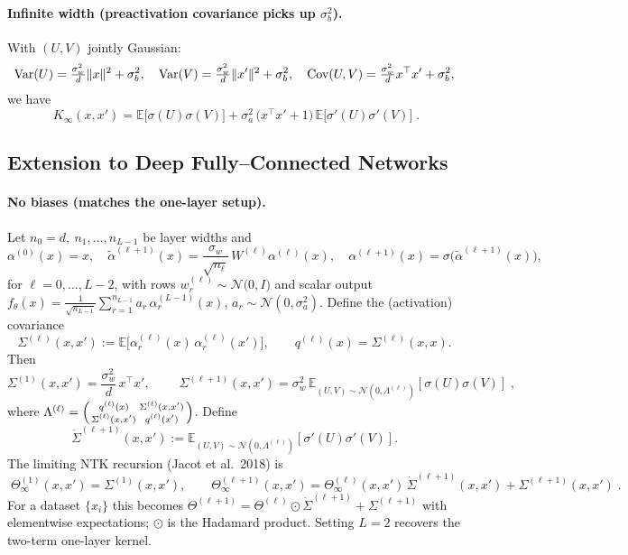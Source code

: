 \paragraph{Infinite width (preactivation covariance picks up $\sigma_b^2$).}

With $(U,V)$ jointly Gaussian:
\[
	\mathrm{Var}(U)=\tfrac{\sigma_w^2}{d}\|x\|^2+\sigma_b^2,\quad
	\mathrm{Var}(V)=\tfrac{\sigma_w^2}{d}\|x'\|^2+\sigma_b^2,\quad
	\mathrm{Cov}(U,V)=\tfrac{\sigma_w^2}{d}x^\top x'+\sigma_b^2,
\]
we have
\[
	\boxed{\;
		K_\infty(x,x')
		=\mathbb E\!\big[\sigma(U)\sigma(V)\big]
		+\sigma_a^2\,\big(x^\top x' + 1\big)\,\mathbb E\!\big[\sigma'(U)\sigma'(V)\big]\; }.
\]

\subsection{Extension to Deep Fully--Connected Networks}\label{subsec:deep-ntk}

\paragraph{No biases (matches the one-layer setup).}

Let $n_0=d,\ n_1,\ldots,n_{L-1}$ be layer widths and
\[
	\alpha^{(0)}(x)=x,\quad
	\tilde\alpha^{(\ell+1)}(x)=\frac{\sigma_w}{\sqrt{n_\ell}}\,W^{(\ell)}\alpha^{(\ell)}(x),\quad
	\alpha^{(\ell+1)}(x)=\sigma\!\big(\tilde\alpha^{(\ell+1)}(x)\big),
\]
for $\ell=0,\dots,L-2$, with rows $w^{(\ell)}_r \sim \mathcal N\!\big(0,I\big)$ and scalar output
$f_\theta(x)=\tfrac{1}{\sqrt{n_{L-1}}}\sum_{r=1}^{n_{L-1}} a_r\,\alpha^{(L-1)}_r(x)$,
$a_r\sim\mathcal N(0,\sigma_a^2)$.
Define the (activation) covariance
\[
	\Sigma^{(\ell)}(x,x'):=\mathbb E\!\big[\alpha^{(\ell)}_r(x)\,\alpha^{(\ell)}_r(x')\big],\qquad
	q^{(\ell)}(x)=\Sigma^{(\ell)}(x,x).
\]
Then
\[
	\Sigma^{(1)}(x,x')=\frac{\sigma_w^2}{d}\,x^\top x',
	\qquad
	\boxed{\;\Sigma^{(\ell+1)}(x,x')
	=\sigma_w^2\,\mathbb E_{(U,V)\sim\mathcal N(0,\Lambda^{(\ell)})}\![\sigma(U)\sigma(V)]\;},
\]
where $\Lambda^{(\ell)}=\begin{psmallmatrix}q^{(\ell)}(x)&\Sigma^{(\ell)}(x,x')\\ \Sigma^{(\ell)}(x,x')&q^{(\ell)}(x')\end{psmallmatrix}$.
Define
\[
	\dot\Sigma^{(\ell+1)}(x,x'):=\mathbb E_{(U,V)\sim\mathcal N(0,\Lambda^{(\ell)})}\![\sigma'(U)\sigma'(V)].
\]
The limiting NTK recursion (Jacot et al.\ 2018) is
\[
	\boxed{\;
		\Theta_\infty^{(1)}(x,x')=\Sigma^{(1)}(x,x'),\qquad
		\Theta_\infty^{(\ell+1)}(x,x')
		=\Theta_\infty^{(\ell)}(x,x')\,\dot\Sigma^{(\ell+1)}(x,x')+\Sigma^{(\ell+1)}(x,x')\; }.
\]
For a dataset $\{x_i\}$ this becomes
$\Theta^{(\ell+1)}=\Theta^{(\ell)}\odot \dot\Sigma^{(\ell+1)}+\Sigma^{(\ell+1)}$
with elementwise expectations; $\odot$ is the Hadamard product.
Setting $L=2$ recovers the two-term one-layer kernel.

